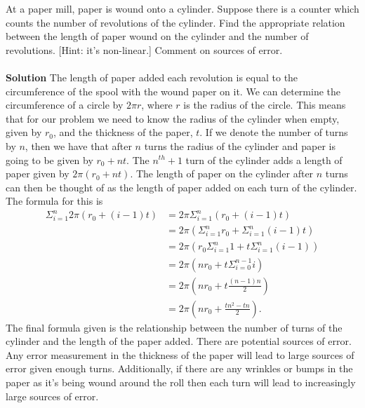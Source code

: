 \documentclass[12pt]{article}
\newenvironment{exercise}[2][Exercise]{\begin{trivlist}
\item[\hskip \labelsep {\bfseries #1}\hskip \labelsep {\bfseries #2.}]}{\end{trivlist}}
\begin{document}
\begin{exercise}{4}
At a paper mill, paper is wound onto a cylinder. Suppose there is a counter which counts the number of revolutions of the cylinder. Find the appropriate relation between the length of paper wound on the cylinder and the number of revolutions. [Hint: it’s non-linear.] Comment on sources of error.
\\
\\
\textbf{Solution}
The length of paper added each revolution is equal to the circumference of the spool with the wound paper on it. We can determine the circumference of a circle by $2\pi r$, where $r$ is the radius of the circle. This means that for our problem we need to know the radius of the cylinder when empty, given by $r_0$, and the thickness of the paper, $t$. If we denote the number of turns by $n$, then we have that after $n$ turns the radius of the cylinder and paper is going to be given by $r_0 + nt$. The $n^{th} + 1$ turn of the cylinder adds a length of paper given by $2 \pi (r_0 + nt)$. The length of paper on the cylinder after $n$ turns can then be thought of as the length of paper added on each turn of the cylinder. The formula for this is 
\begin{align*}
\Sigma_{i = 1}^{n} 2\pi (r_0 + (i - 1)t) &= 2 \pi \Sigma_{i = 1}^{n} (r_0 + (i - 1)t) \\
&= 2 \pi (\Sigma_{i = 1}^{n} r_0 + \Sigma_{i = 1}^{n} (i - 1) t)\\
&= 2 \pi (r_0 \Sigma_{i = 1}^{n}1+ t\Sigma_{i = 1}^{n} (i - 1)) \\
&= 2 \pi (nr_0 + t\Sigma_{i = 0}^{n - 1}i) \\
&= 2 \pi (nr_0 + t\frac{(n - 1)n}{2}) \\
&= 2 \pi (nr_0 + \frac{tn^2 - tn}{2}).
\end{align*}
The final formula given is the relationship between the number of turns of the cylinder and the length of the paper added. There are potential sources of error. Any error measurement in the thickness of the paper will lead to large sources of error given enough turns. Additionally, if there are any wrinkles or bumps in the paper as it's being wound around the roll then each turn will lead to increasingly large sources of error.
\end{exercise}

 
\end{document}
